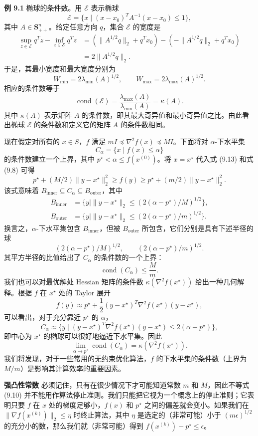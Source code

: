 \documentclass[UTF8,12pt,a4paper,fontset=fandol]{ctexart}
\begin{document}
\noindent\textbf{例 9.1}\quad
椭球的条件数。用 $\mathcal{E}$ 表示椭球
\[
\mathcal{E}=\{x\mid (x-x_0)^TA^{-1}(x-x_0)\leq1\},
\]
其中 $A\in\mathbf{S}_{++}^n$。给定任意方向 $q$，集合 $\mathcal{E}$ 的宽度是
\[
\begin{aligned}
\sup_{z\in\mathcal{E}}q^Tz-\inf_{z\in\mathcal{E}}q^Tz
&=(\|A^{1/2}q\|_2+q^Tx_0)-(-\|A^{1/2}q\|_2+q^Tx_0)\\
&=2\|A^{1/2}q\|_2.
\end{aligned}
\]
于是，其最小宽度和最大宽度分别为
\[
W_{\min}=2\lambda_{\min}(A)^{1/2},\qquad
W_{\max}=2\lambda_{\max}(A)^{1/2}.
\]
相应的条件数等于
\[
\operatorname{cond}(\mathcal{E})=\frac{\lambda_{\max}(A)}{\lambda_{\min}(A)}=\kappa(A).
\]
其中 $\kappa(A)$ 表示矩阵 $A$ 的条件数，即其最大奇异值和最小奇异值之比。由此看出椭球 $\mathcal{E}$ 的条件数和定义它的矩阵 $A$ 的条件数相同。

现在假定对所有的 $x\in S$，$f$ 满足 $mI\preceq\nabla^2 f(x)\preceq MI$。下面将对 $\alpha$-下水平集
\[
C_\alpha=\{x\mid f(x)\leq\alpha\}
\]
的条件数建立一个上界，其中 $p^\star<\alpha\leq f(x^{(0)})$。将 $x=x^\star$ 代入式 (9.13) 和式 (9.8) 可得
\[
p^\star+(M/2)\|y-x^\star\|_2^2\geq f(y)\geq p^\star+(m/2)\|y-x^\star\|_2^2.
\]
该式意味着 $B_{\mathrm{inner}}\subseteq C_\alpha\subseteq B_{\mathrm{outer}}$，其中
\[
\begin{aligned}
B_{\mathrm{inner}}&=\{y\mid \|y-x^\star\|_2\leq (2(\alpha-p^\star)/M)^{1/2}\},\\
B_{\mathrm{outer}}&=\{y\mid \|y-x^\star\|_2\leq (2(\alpha-p^\star)/m)^{1/2}\}.
\end{aligned}
\]
换言之，$\alpha$-下水平集包含 $B_{\mathrm{inner}}$，但被 $B_{\mathrm{outer}}$ 所包含，它们分别是具有下述半径的球
\[
(2(\alpha-p^\star)/M)^{1/2},\qquad (2(\alpha-p^\star)/m)^{1/2}.
\]
其平方半径的比值给出了 $C_\alpha$ 的条件数的一个上界：
\[
\operatorname{cond}(C_\alpha)\leq\frac{M}{m}.
\]
我们也可以对最优解处 Hessian 矩阵的条件数 $\kappa(\nabla^2 f(x^\star))$ 给出一种几何解释。根据 $f$ 在 $x^\star$ 处的 Taylor 展开
\[
f(y)\approx p^\star+\frac{1}{2}(y-x^\star)^T\nabla^2 f(x^\star)(y-x^\star),
\]
可以看出，对于充分靠近 $p^\star$ 的 $\alpha$，
\[
C_\alpha\approx \{y\mid (y-x^\star)^T\nabla^2 f(x^\star)(y-x^\star)\leq 2(\alpha-p^\star)\},
\]
即中心为 $x^\star$ 的椭球可以很好地逼近下水平集。因此
\[
\lim_{\alpha\to p^\star}\operatorname{cond}(C_\alpha)=\kappa(\nabla^2 f(x^\star)).
\]
我们将发现，对于一些常用的无约束优化算法，$f$ 的下水平集的条件数（上界为 $M/m$）是影响其计算效率的重要因素。

\noindent\textbf{强凸性常数}\quad
必须记住，只有在很少情况下才可能知道常数 $m$ 和 $M$，因此不等式 (9.10) 并不能用作算法停止准则。我们只能把它视为一个概念上的停止准则；它表明只要 $f$ 在 $x$ 处的梯度足够小，$f(x)$ 和 $p^\star$ 之间的偏差就会变小。如果我们在 $\|\nabla f(x^{(k)})\|_2\leq\eta$ 时终止算法，其中 $\eta$ 是选定的（非常可能）小于 $(m\epsilon)^{1/2}$ 的充分小的数，那么我们就（非常可能）得到 $f(x^{(k)})-p^\star\leq\epsilon$。
\end{document}
